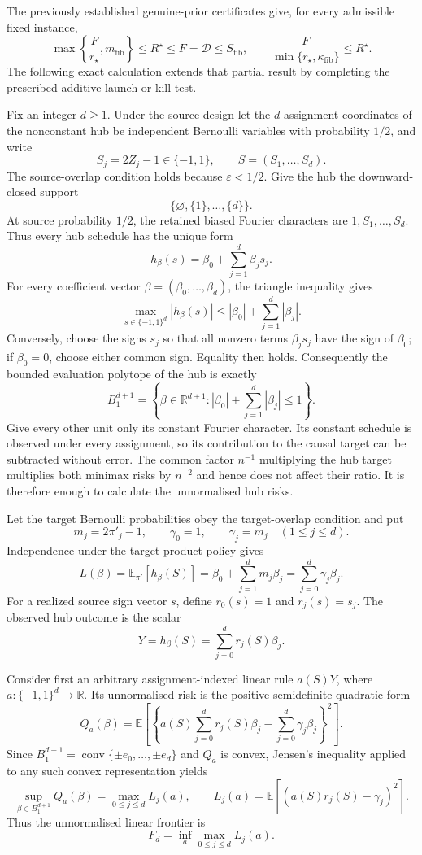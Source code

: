 The previously established genuine-prior certificates give, for every admissible fixed instance,
\[
 \max\left\{\frac{F}{r_{\star}},m_{\mathrm{fib}}\right\}
 \le R^{\star}\le F=\mathcal D\le S_{\mathrm{fib}},
 \qquad
 \frac{F}{\min\{r_{\star},\kappa_{\mathrm{fib}}\}}
 \le R^{\star}.
\]
The following exact calculation extends that partial result by completing the prescribed additive launch-or-kill test.

Fix an integer \(d\ge1\).  Under the source design let the \(d\) assignment coordinates of the nonconstant hub be independent Bernoulli variables with probability \(1/2\), and write
\[
 S_j=2Z_j-1\in\{-1,1\},
 \qquad
 S=(S_1,\ldots,S_d).
\]
The source-overlap condition holds because \(\varepsilon<1/2\).  Give the hub the downward-closed support
\[
 \{\varnothing,\{1\},\ldots,\{d\}\}.
\]
At source probability \(1/2\), the retained biased Fourier characters are \(1,S_1,\ldots,S_d\).  Thus every hub schedule has the unique form
\[
 h_{\beta}(s)=\beta_0+\sum_{j=1}^d\beta_js_j.
\]
For every coefficient vector \(\beta=(\beta_0,\ldots,\beta_d)\), the triangle inequality gives
\[
 \max_{s\in\{-1,1\}^d}|h_{\beta}(s)|
 \le |\beta_0|+\sum_{j=1}^d|\beta_j|.
\]
Conversely, choose the signs \(s_j\) so that all nonzero terms \(\beta_js_j\) have the sign of \(\beta_0\); if \(\beta_0=0\), choose either common sign.  Equality then holds.  Consequently the bounded evaluation polytope of the hub is exactly
\[
 B_1^{d+1}=\left\{\beta\in\mathbb R^{d+1}:
 |\beta_0|+\sum_{j=1}^d|\beta_j|\le1\right\}.
\]
Give every other unit only its constant Fourier character.  Its constant schedule is observed under every assignment, so its contribution to the causal target can be subtracted without error.  The common factor \(n^{-1}\) multiplying the hub target multiplies both minimax risks by \(n^{-2}\) and hence does not affect their ratio.  It is therefore enough to calculate the unnormalised hub risks.

Let the target Bernoulli probabilities obey the target-overlap condition and put
\[
 m_j=2\pi'_j-1,
 \qquad
 \gamma_0=1,
 \qquad
 \gamma_j=m_j\quad(1\le j\le d).
\]
Independence under the target product policy gives
\[
 L(\beta)=\mathbb E_{\pi'}[h_{\beta}(S)]
 =\beta_0+\sum_{j=1}^dm_j\beta_j
 =\sum_{j=0}^d\gamma_j\beta_j.
\]
For a realized source sign vector \(s\), define \(r_0(s)=1\) and \(r_j(s)=s_j\).  The observed hub outcome is the scalar
\[
 Y=h_{\beta}(S)=\sum_{j=0}^dr_j(S)\beta_j.
\]

Consider first an arbitrary assignment-indexed linear rule \(a(S)Y\), where \(a:\{-1,1\}^d\to\mathbb R\).  Its unnormalised risk is the positive semidefinite quadratic form
\[
 Q_a(\beta)=
 \mathbb E\!\left[
 \left\{a(S)\sum_{j=0}^dr_j(S)\beta_j-
             \sum_{j=0}^d\gamma_j\beta_j\right\}^2
 \right].
\]
Since \(B_1^{d+1}=\operatorname{conv}\{\pm e_0,\ldots,\pm e_d\}\) and \(Q_a\) is convex, Jensen's inequality applied to any such convex representation yields
\[
 \sup_{\beta\in B_1^{d+1}}Q_a(\beta)
 =\max_{0\le j\le d}L_j(a),
 \qquad
 L_j(a)=\mathbb E[(a(S)r_j(S)-\gamma_j)^2].
\]
Thus the unnormalised linear frontier is
\[
 F_d=\inf_a\max_{0\le j\le d}L_j(a).
\]

